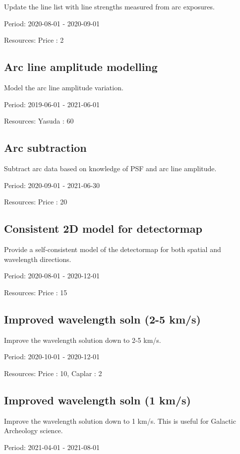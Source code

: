 Update the line list with line strengths measured from arc exposures.

Period: 2020-08-01 - 2020-09-01

Resources: Price : 2

\subsection{Arc line amplitude modelling}

Model the arc line amplitude variation.

Period: 2019-06-01 - 2021-06-01

Resources: Yasuda : 60

\subsection{Arc subtraction}

Subtract arc data based on knowledge of PSF and arc line amplitude.

Period: 2020-09-01 - 2021-06-30

Resources: Price : 20

\subsection{Consistent 2D model for detectormap}

Provide a self-consistent model of the detectormap for both spatial and wavelength directions.

Period: 2020-08-01 - 2020-12-01

Resources: Price : 15

\subsection{Improved wavelength soln (2-5 km/s)}

Improve the wavelength solution down to 2-5 km/s.

Period: 2020-10-01 - 2020-12-01

Resources: Price : 10, Caplar : 2

\subsection{Improved wavelength soln (1 km/s)}

Improve the wavelength solution down to 1 km/s. This is useful for Galactic Archeology science.

Period: 2021-04-01 - 2021-08-01

